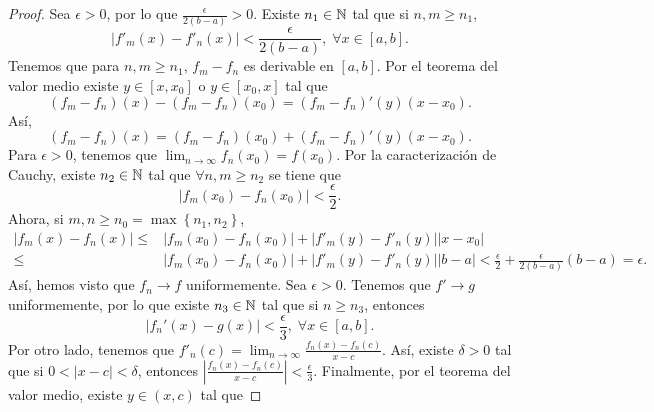 \begin{proof}
	Sea $\displaystyle \epsilon > 0 $, por lo que $\displaystyle \frac{\epsilon }{2\left(b-a\right)} > 0 $. Existe $\displaystyle n_{1} \in \mathbb{N} $ tal que si $\displaystyle n,m \geq n_{1} $,
\[ \left|f'_{m}\left(x\right)-f'_{n}\left(x\right)\right|<\frac{\epsilon }{2\left(b-a\right)}, \; \forall x \in \left[a,b\right]  .\]
Tenemos que para $\displaystyle n,m \geq n_{1} $, $\displaystyle f_{m}-f_{n} $ es derivable en $\displaystyle \left[a,b\right]  $. Por el teorema del valor medio existe $\displaystyle y \in \left[x,x_{0}\right]  $ o $\displaystyle y \in \left[x_{0}, x\right]  $ tal que 
\[ \left(f_{m}-f_{n}\right)\left(x\right)-\left(f_{m}-f_{n}\right)\left(x_{0}\right) = \left(f_{m}-f_{n}\right)'\left(y\right) \left(x-x_{0}\right)	.\]
Así, 
\[\left(f_{m}-f_{n}\right)\left(x\right) = \left(f_{m}-f_{n}\right)\left(x_{0}\right) + \left(f_{m}-f_{n}\right)'\left(y\right) \left(x-x_{0}\right) .\]
Para $\displaystyle \epsilon > 0 $, tenemos que $\displaystyle \lim_{n \to \infty}f_{n}\left(x_{0}\right) = f\left(x_{0}\right) $. Por la caracterización de Cauchy, existe $\displaystyle n_{2} \in \mathbb{N} $ tal que $\displaystyle \forall n,m \geq n_{2} $ se tiene que 
\[ \left|f_{m}\left(x_{0}\right)-f_{n}\left(x_{0}\right)\right| < \frac{\epsilon }{2} .\]
Ahora, si $\displaystyle m,n \geq n_{0} = \max \left\{ n_{1}, n_{2}\right\}  $,
\[
\begin{split}
	\left|f_{m}\left(x\right)-f_{n}\left(x\right)\right| \leq & \left|f_{m}\left(x_{0}\right)-f_{n}\left(x_{0}\right)\right|+ \left|f'_{m}\left(y\right)-f'_{n}\left(y\right)\right| \left|x-x_{0}\right| \\
	\leq & \left|f_{m}\left(x_{0}\right)-f_{n}\left(x_{0}\right)\right| + \left|f'_{m}\left(y\right)-f'_{n}\left(y\right)\right| \left|b-a\right| < \frac{\epsilon }{2} + \frac{\epsilon }{2\left(b-a\right)}\left(b-a\right) = \epsilon  .
\end{split}
\]
Así, hemos visto que $\displaystyle f_{n} \to f$ uniformemente. Sea $\displaystyle \epsilon > 0 $. Tenemos que $\displaystyle f' \to g $ uniformemente, por lo que existe $\displaystyle n_{3} \in \mathbb{N} $ tal que si $\displaystyle n \geq n_{3} $, entonces
\[ \left|f_{n}'\left(x\right)-g\left(x\right)\right| < \frac{\epsilon }{3}, \; \forall x \in \left[a,b\right]  .\]
Por otro lado, tenemos que $\displaystyle f'_{n}\left(c\right) = \lim_{n \to \infty}\frac{f_{n}\left(x\right)-f_{n}\left(c\right)}{x-c} $. Así, existe $\displaystyle \delta > 0 $ tal que si $\displaystyle 0<\left|x-c\right|<\delta  $, entonces $\displaystyle \left|\frac{f_{n}\left(x\right)-f_{n}\left(c\right)}{x-c}\right|<\frac{\epsilon }{3} $. Finalmente, por el teorema del valor medio, existe $\displaystyle y \in \left(x,c\right) $ tal que 

\end{proof}
